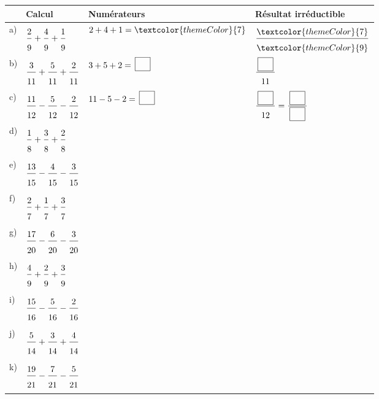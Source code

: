 \newpage
{}
 
\def\arraystretch{3}
\begin{tabularx}{\linewidth}{|>{\centering\arraybackslash}p{0.8cm}|>{\centering\arraybackslash}p{6.3cm}|>{\centering\arraybackslash}X|>{\centering\arraybackslash}X|}
\hline
\cellcolor{themeNO!30} & \cellcolor{themeNO!30}\textbf{Calcul} & \cellcolor{themeNO!30}\textbf{Numérateurs} & \cellcolor{themeNO!30}\textbf{Résultat irréductible} \\\hline
a) & $\FA{2}{9}+\FA{4}{9}+\FA{1}{9}$ & $2 + 4 + 1=\textcolor{themeColor}{7}$ & $\FA{\textcolor{themeColor}{7}}{\textcolor{themeColor}{9}}$ \\\hline
b) & $\FA{3}{11}+\FA{5}{11}+\FA{2}{11}$ & $3 + 5 + 2=\CaseC$ & $\FA{\CaseC}{11}$ \\\hline
c) & $\FA{11}{12}-\FA{5}{12}-\FA{2}{12}$ & $11 - 5 - 2=\CaseC$ & $\FA{\CaseC}{12}=\FA{\CaseC}{\CaseC}$ \\\hline
d) & $\FA{1}{8}+\FA{3}{8}+\FA{2}{8}$ &  &  \\\hline
e) & $\FA{13}{15}-\FA{4}{15}-\FA{3}{15}$ &  &  \\\hline
f) & $\FA{2}{7}+\FA{1}{7}+\FA{3}{7}$ &  &  \\\hline
g) & $\FA{17}{20}-\FA{6}{20}-\FA{3}{20}$ &  &  \\\hline
h) & $\FA{4}{9}+\FA{2}{9}+\FA{3}{9}$ &  &  \\\hline
i) & $\FA{15}{16}-\FA{5}{16}-\FA{2}{16}$ &  &  \\\hline
j) & $\FA{5}{14}+\FA{3}{14}+\FA{4}{14}$ &  &  \\\hline
k) & $\FA{19}{21}-\FA{7}{21}-\FA{5}{21}$ &  &  \\\hline
\end{tabularx}
\def\arraystretch{1}
 
\newpage
{}
 

